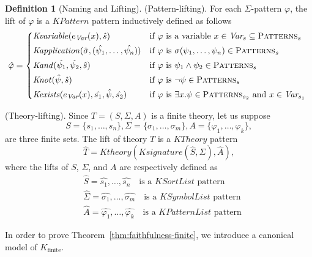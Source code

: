 \documentclass[UTF8,11pt]{article}
\newcounter{thmcounter}
\theoremstyle{plain}
\theoremstyle{definition}
\newtheorem{definition} [thmcounter]{Definition}
\theoremstyle{remark}
\newcommand{\PATTERNS}{\text{P\textsc{atterns}}}
\newcommand{\Kfinite}{{K_\text{finite}}}
\newcommand{\KPatternList}{\mathit{KPatternList}}
\newcommand{\KSortList}{\mathit{KSortList}}
\newcommand{\KSymbolList}{\mathit{KSymbolList}}
\newcommand{\KPattern}{\mathit{KPattern}}
\newcommand{\Kvariable}{\mathit{Kvariable}}
\newcommand{\Kand}{\mathit{Kand}}
\newcommand{\Knot}{\mathit{Knot}}
\newcommand{\Kapplication}{\mathit{Kapplication}}
\newcommand{\Kexists}{\mathit{Kexists}}
\newcommand{\Ksignature}{\mathit{Ksignature}}
\newcommand{\KTheory}{\mathit{KTheory}}
\newcommand{\Ktheory}{\mathit{Ktheory}}
\begin{document}
\begin{definition}[Naming and Lifting]
    (Pattern-lifting).
    For each $\Sigma$-pattern $\varphi$, the lift of $\varphi$ is a $\KPattern$ pattern inductively defined as follows
    \begin{equation*}
      \hat{\varphi} =
      \begin{cases*}
        \Kvariable(e_\Var(x), \hat{s}) & if $\varphi$ is a variable $x \in \Var_s \subseteq \PATTERNS_s$
        \\
        \Kapplication(\hat{\sigma}, (\hat{\psi_1}, \dots, \hat{\psi_n})) & if $\varphi$ is $\sigma(\psi_1,\dots,\psi_n) \in \PATTERNS_s$
        \\
        \Kand(\hat{\psi_1}, \hat{\psi_2}, \hat{s}) & if $\varphi$ is $\psi_1 \wedge \psi_2 \in \PATTERNS_s$
        \\
        \Knot(\hat{\psi}, \hat{s}) & if $\varphi$ is $\neg \psi \in \PATTERNS_s$
        \\
        \Kexists(e_\Var(x), \hat{s_1}, \hat{\psi}, \hat{s_2}) & if $\varphi$ is $\exists x . \psi \in \PATTERNS_{s_2}$ and $x \in \Var_{s_1}$
      \end{cases*}
    \end{equation*}
    
    (Theory-lifting). Since $T = (S, \Sigma, A)$ is a finite theory, let us suppose
    \begin{equation*}
       S = \{ s_1, \dots, s_n \}, 
       \Sigma = \{ \sigma_1, \dots, \sigma_m \}, 
       A = \{ \varphi_1, \dots, \varphi_k \},
    \end{equation*}
    are three finite sets. The lift of theory $T$ is a $\KTheory$ pattern 
    $$ \hat{T} = \Ktheory(\Ksignature(\hat{S}, \hat{\Sigma}), \hat{A}),$$
    where the lifts of $S$, $\Sigma$, and $A$ are respectively defined as
    \begin{align*}
    & \hat{S} = \hat{s_1},\dots,\hat{s_n} 
      \quad \text{is a $\KSortList$ pattern}
    \\
    & \hat{\Sigma} = \hat{\sigma_1},\dots,\hat{\sigma_m}
      \quad \text{is a $\KSymbolList$ pattern}
    \\
    & \hat{A} = \hat{\varphi_1}, \dots, \hat{\varphi_k}
      \quad \text{is a $\KPatternList$ pattern}
    \end{align*}
\end{definition}

In order to prove Theorem~\ref{thm:faithfulness-finite}, we introduce a canonical model of $\Kfinite$.
\end{document}
